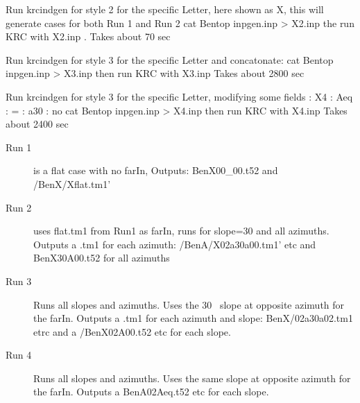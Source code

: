 \documentclass{article}
\begin{document}
Run krcindgen for style 2 for the specific Letter, here shown as X, this will generate cases for both Run 1 and Run 2
\qi cat Bentop  inpgen.inp > X2.inp
\qi the run KRC with X2.inp . Takes about 70 sec

Run krcindgen for style 3 for the specific Letter and concatonate:
\qi cat Bentop  inpgen.inp > X3.inp
\qi then run KRC with X3.inp  Takes about 2800 sec

Run krcindgen for style 3 for the specific Letter, modifying some fields
: X4
: Aeq
: = 
: a30
: no
\qi  cat Bentop  inpgen.inp > X4.inp
\qi then run KRC with X4.inp  Takes about 2400 sec

\begin{description}  %
 \item [Run 1] is a flat case with no farIn, Outputs:  BenX00_00.t52 and /BenX/Xflat.tm1'
 \item [Run 2] uses flat.tm1 from Run1 as farIn, runs for slope=30 and all azimuths. 
Outputs a .tm1 for each azimuth: /BenA/X02a30a00.tm1' etc and BenX30A00.t52
for all azimuths

 \item [Run 3] Runs all slopes and azimuths. Uses the 30\qd~ slope at opposite
   azimuth for the farIn. Outputs a .tm1 for each azimuth and slope:
   BenX/02a30a02.tm1 etrc and a /BenX02A00.t52 etc for each slope.

 \item [Run 4] Runs all slopes and azimuths. Uses the same slope at opposite
   azimuth for the farIn.  Outputs a BenA02Aeq.t52 etc for each slope.
 \end{description}
\end{document}
